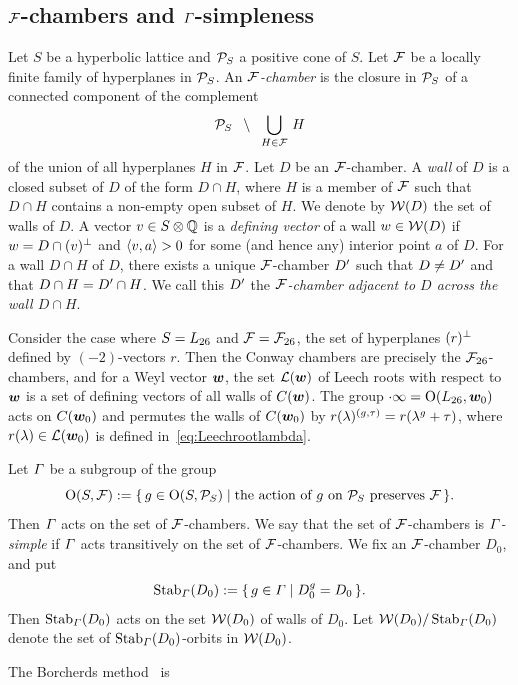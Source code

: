 \documentclass{amsart} %
\begin{document}
\subsection{$\mathord{\mathcal{F}}$-chambers and $\varGamma$-simpleness}\label{subsec:FFF}
%
%
Let $S$ be a hyperbolic lattice
and $\mathord{\mathcal{P}}_S$ a positive cone of $S$.
Let $\mathord{\mathcal{F}}$ be a locally finite family of hyperplanes in $\mathord{\mathcal{P}}_S$.
An \emph{$\mathord{\mathcal{F}}$-chamber} is the closure in $\mathord{\mathcal{P}}_S$ of a connected component 
of the complement
\[
\mathord{\mathcal{P}}_S\;\;\setminus \;\; \bigcup_{H\in \mathord{\mathcal{F}}}\, H
\]
of the union of all hyperplanes $H$ in $\mathord{\mathcal{F}}$.
Let $D$ be an $\mathord{\mathcal{F}}$-chamber.
A \emph{wall} of $D$ is a closed subset of $D$
of the form $D\cap H$, where $H$ is a member of $\mathord{\mathcal{F}}$
such that $D\cap H$ contains a non-empty open subset of $H$.
We denote by $\mathord{\mathcal{W}}(D)$ the set of walls of $D$.
A vector $v\in S\otimes\mathord{\mathbb{Q}}$ is a \emph{defining vector} of a wall $w\in \mathord{\mathcal{W}}(D)$ 
if $w=D\cap (v)^{\perp}$ and $\langle v, a \rangle>0$ for some (and hence any) interior point $a$ of $D$.
For a wall $D\cap H$ of $D$,
there exists a unique $\mathord{\mathcal{F}}$-chamber $D^{\prime}$
such that $D\ne D^{\prime}$ and that $D\cap H=D^{\prime}\cap H$.
We call this $D^{\prime}$ the \emph{$\mathord{\mathcal{F}}$-chamber adjacent to $D$ across the wall $D\cap H$}.
%
\begin{example}
Consider the case where $S=L_{26}$ and $\mathord{\mathcal{F}}={\mathord{\mathcal{F}}}_{26}$, 
the set of hyperplanes $(r)^{\perp}$ defined by $(-2)$-vectors $r$.
Then the Conway chambers are precisely the ${\mathord{\mathcal{F}}}_{26}$-chambers,
and for a Weyl vector $\boldsymbol{w}$,
the set $\mathord{\mathcal{L}}(\boldsymbol{w})$ of Leech roots with respect to $\boldsymbol{w}$ is 
a set of 
defining vectors of all walls of $\mathord{C}(\boldsymbol{w})$.
The group $\cdot \infty=\mathord{\mathrm{O}}(L_{26}, \boldsymbol{w}_0)$ 
acts on $\mathord{C}(\boldsymbol{w}_0)$ 
and permutes 
the walls of $\mathord{C}(\boldsymbol{w}_0)$ by 
$r(\lambda)^{(g, \tau)}=r(\lambda^g+\tau)$,
where $r(\lambda)\in \mathord{\mathcal{L}}(\boldsymbol{w}_0)$ is 
defined in~\eqref{eq:Leechrootlambda}.
\end{example}
%
Let $\varGamma$ be a subgroup
of the group 
\[
\mathord{\mathrm{O}}(S, \mathord{\mathcal{F}}):=\{\,{g\in \mathord{\mathrm{O}}(S, \mathord{\mathcal{P}}_S)}\mid {\textrm{the action of $g$ on $\mathord{\mathcal{P}}_S$ preserves $\mathord{\mathcal{F}}$}} \,\}.
\]
%
%
Then $\varGamma$ acts on the set of $\mathord{\mathcal{F}}$-chambers.
We say that the set of $\mathord{\mathcal{F}}$-chambers is \emph{$\varGamma$-simple}
if $\varGamma$ acts transitively on the set of $\mathord{\mathcal{F}}$-chambers.
We fix an $\mathord{\mathcal{F}}$-chamber $D_0$, and put
\[
\operatorname{Stab}_{\varGamma}(D_0):=\{\,{g\in \varGamma}\mid {D_0^g=D_0} \,\}.
\]
Then $\operatorname{Stab}_{\varGamma}(D_0)$ acts on the set $\mathord{\mathcal{W}}(D_0)$ of walls of $D_0$.
Let $\mathord{\mathcal{W}}(D_0)/\operatorname{Stab}_{\varGamma}(D_0)$ denote the set of 
$\operatorname{Stab}_{\varGamma}(D_0)$-orbits in $\mathord{\mathcal{W}}(D_0)$.
\par
The Borcherds method~\cite{MR913200, MR1654763} is 
\end{document}
